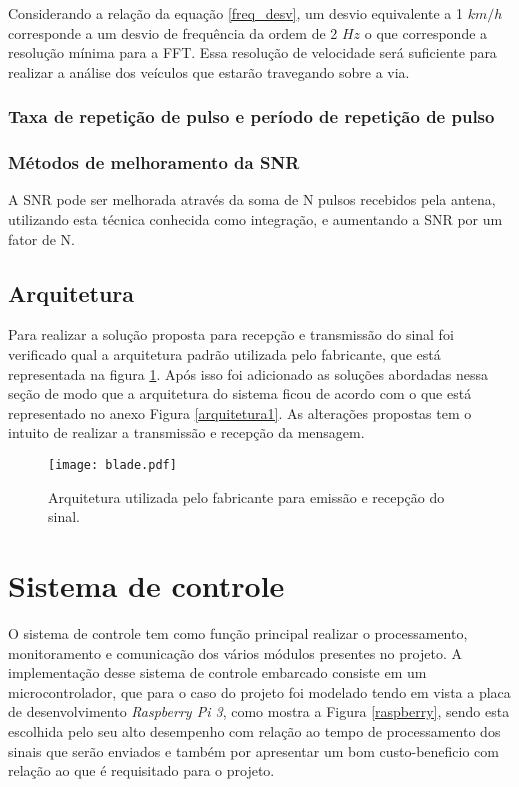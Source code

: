 Considerando a relação da equação \ref{freq_desv}, um desvio equivalente a 1 $km/h$ corresponde a um desvio de frequência da ordem de 2 $Hz$ o que corresponde a resolução mínima para a FFT. Essa resolução de velocidade será suficiente para realizar a análise dos veículos que estarão travegando sobre a via.%
 \subsubsection{Taxa de repetição de pulso e período de repetição de pulso}
 
 
\subsubsection{Métodos de melhoramento da SNR}%
A SNR pode ser melhorada através da soma de N pulsos recebidos pela antena, utilizando esta técnica conhecida como integração, %
e aumentando a SNR por um fator de N.


\subsection{Arquitetura}

Para realizar a solução proposta para recepção e transmissão do sinal foi verificado qual a arquitetura padrão utilizada pelo fabricante, que está representada na figura \ref{arquitetura}. Após isso foi adicionado as soluções abordadas nessa seção de modo que a arquitetura do sistema ficou de acordo com o que está representado no anexo  Figura \ref{arquitetura1}. As alterações propostas tem o intuito de realizar a transmissão e recepção da mensagem.
\begin{figure}[H]
    \centering
   \texttt{[image: blade.pdf]}
   \caption{Arquitetura utilizada pelo fabricante para emissão e recepção do sinal.}
   \label{arquitetura}
    \end{figure}
    
        
\section{Sistema de controle}
    O sistema de controle tem como função principal realizar o processamento, monitoramento e comunicação dos vários módulos presentes no projeto. A implementação desse sistema de controle embarcado consiste em um microcontrolador, que para o caso do projeto foi modelado tendo em vista a placa de desenvolvimento \emph{Raspberry Pi 3}, como mostra a Figura \ref{raspberry}, sendo esta escolhida pelo seu alto desempenho com relação ao tempo de processamento dos sinais que serão enviados e também por apresentar um bom custo-beneficio com relação ao que é requisitado para o projeto. 
    
